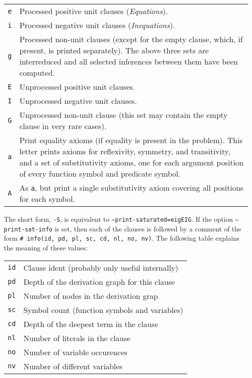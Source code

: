 \documentclass{report}
\begin{document}
\begin{tabular}{lp{9cm}}
  \texttt{e} & Processed positive unit clauses (\emph{Equations}).\\
  \texttt{i} & Processed negative unit clauses (\emph{Inequations}).\\
  \texttt{g} & Processed non-unit clauses (except for the empty
  clause, which, if present, is printed separately). The above three
  sets are interreduced and all selected inferences between them have
  been computed.\\
  \texttt{E} & Unprocessed positive unit clauses.\\
  \texttt{I} & Unprocessed negative unit clauses.\\
  \texttt{G} & Unprocessed non-unit clause (this set may contain the
  empty clause in very rare cases).\\
  \texttt{a} & Print equality axioms (if equality is present in the
  problem). This letter prints axioms for reflexivity, symmetry, and
  transitivity, and a set of substitutivity axioms, one for each
  argument position of every function symbol and predicate symbol.\\
  \texttt{A} & As \texttt{a}, but print a single substitutivity axiom
  covering all positions for each symbol.\\
\end{tabular}

The short form, \texttt{-S}, is equivalent to
\texttt{--print-saturated=eigEIG}. If the option
\texttt{--print-sat-info} is set, then each of the clauses is followed
by a comment of the form \texttt{\# info(id, pd, pl, sc, cd, nl,
  no, nv)}. The following table explains the meaning of these values:

\begin{tabular}{lp{10cm}}
\texttt{id} & Clause ident (probably only useful internally) \\
\texttt{pd} & Depth of the derivation graph for this clause \\
\texttt{pl} & Number of nodes in the derivation grap \\
\texttt{sc} & Symbol count (function symbols and variables) \\
\texttt{cd} & Depth of the deepest term in the clause \\
\texttt{nl} & Number of literals in the clause \\
\texttt{no} & Number of variable occurences \\
\texttt{nv} & Number of different variables \\
\end{tabular}
\end{document}
